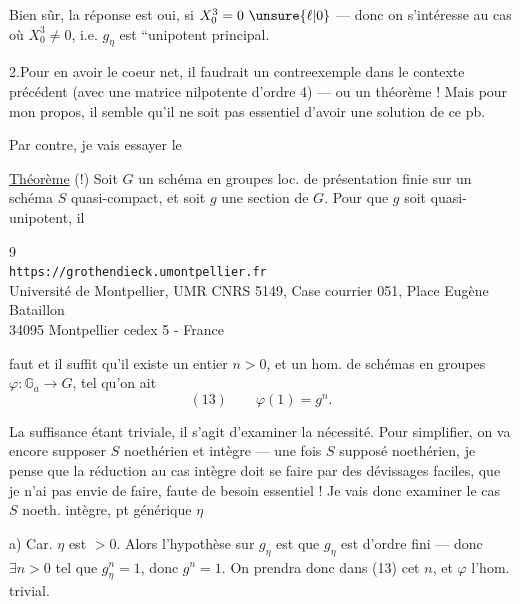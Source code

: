 Bien sûr, la  réponse est  oui, si $X_0^3=0\ \unsure{\ell|0}$  --- donc on s'intéresse au cas où $X_0^3\ne0$, i.e.  $g_\eta$ est ``unipotent principal.

2.\quad Pour en avoir le coeur net, il faudrait un contreexemple dans le contexte précédent (avec une matrice nilpotente d'ordre 4) --- ou un théorème ! Mais pour mon propos, il semble qu'il ne soit pas essentiel d'avoir une solution de ce pb.

Par contre, je vais essayer le

\uline{Théorème} (!) Soit $G$ un schéma en groupes  loc. de présentation finie sur un schéma $S$ quasi-compact, et soit $g$ une section de $G$. Pour que $g$ soit quasi-unipotent, il

\begin{center}
\small
9\\
\texttt{https://grothendieck.umontpellier.fr}\\
Université de Montpellier, UMR CNRS 5149, Case courrier 051, Place Eugène Bataillon\\
34095 Montpellier cedex 5 - France
\end{center}

faut et il suffit qu'il existe un entier $n>0$, et un hom. de schémas en groupes $\varphi:\mathbb G_a\longrightarrow G$, tel qu'on ait
\[
(13)\qquad \varphi(1)=g^n.
\]

La suffisance étant triviale, il s'agit d'examiner la nécessité. Pour simplifier, on va encore supposer $S$ noethérien et intègre --- une fois $S$ supposé noethérien, je pense que la réduction au cas intègre doit se faire par des dévissages faciles, que je n'ai pas envie de faire, faute de besoin essentiel ! Je vais donc examiner le cas $S$ noeth. intègre, pt générique $\eta$

a) Car.  $\eta$ est $>0$. Alors  l'hypothèse sur $g_\eta$ est que $g_\eta$ est d'ordre fini --- donc $\exists n>0$ tel que $g_\eta^n=1$, donc $g^n=1$. On prendra donc dans (13) cet $n$, et $\varphi$ l'hom. trivial.

